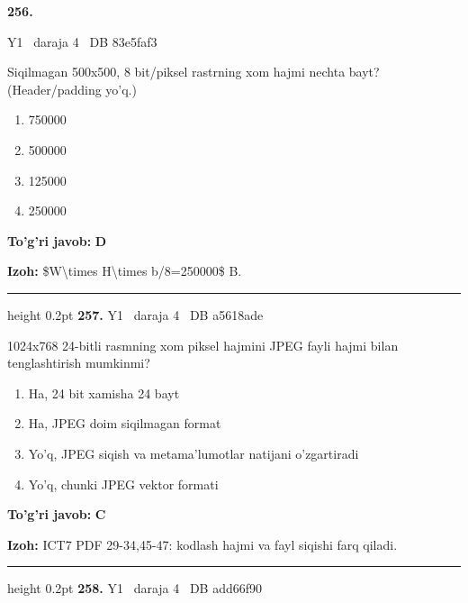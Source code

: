 \documentclass[10pt,a4paper,oneside]{article}
\begin{document}
\hypertarget{q256}{\textbf{\color{ink}256.}}  {\color{muted}\scriptsize Y1 \textbullet\ daraja 4 \textbullet\ DB 83e5faf3}
\par
Siqilmagan 500x500, 8 bit/piksel rastrning xom hajmi nechta bayt? (Header/padding yo'q.)
\begin{enumerate}[label=\Alph*),leftmargin=9mm]
\item 750000
\item 500000
\item 125000
\item 250000
\end{enumerate}
\begin{tcolorbox}[enhanced,breakable,colback=teal!4,colframe=teal!45!black,boxrule=0.45pt,arc=1.2mm,left=2.8mm,right=2.8mm,top=2mm,bottom=2mm,before skip=2mm,after skip=2mm]
\textbf{\color{teal}To'g'ri javob:} \textbf{D}
\par\smallskip
\textbf{Izoh:} \$W\textbackslash{}times H\textbackslash{}times b/8=250000\$ B.
\end{tcolorbox}
\vspace{2mm}\hrule height 0.2pt \vspace{4mm}
\hypertarget{q257}{\textbf{\color{ink}257.}}  {\color{muted}\scriptsize Y1 \textbullet\ daraja 4 \textbullet\ DB a5618ade}
\par
1024x768 24-bitli rasmning xom piksel hajmini JPEG fayli hajmi bilan tenglashtirish mumkinmi?
\begin{enumerate}[label=\Alph*),leftmargin=9mm]
\item Ha, 24 bit xamisha 24 bayt
\item Ha, JPEG doim siqilmagan format
\item Yo'q, JPEG siqish va metama'lumotlar natijani o'zgartiradi
\item Yo'q, chunki JPEG vektor formati
\end{enumerate}
\begin{tcolorbox}[enhanced,breakable,colback=teal!4,colframe=teal!45!black,boxrule=0.45pt,arc=1.2mm,left=2.8mm,right=2.8mm,top=2mm,bottom=2mm,before skip=2mm,after skip=2mm]
\textbf{\color{teal}To'g'ri javob:} \textbf{C}
\par\smallskip
\textbf{Izoh:} ICT7 PDF 29-34,45-47: kodlash hajmi va fayl siqishi farq qiladi.
\end{tcolorbox}
\vspace{2mm}\hrule height 0.2pt \vspace{4mm}
\hypertarget{q258}{\textbf{\color{ink}258.}}  {\color{muted}\scriptsize Y1 \textbullet\ daraja 4 \textbullet\ DB add66f90}
\end{document}
